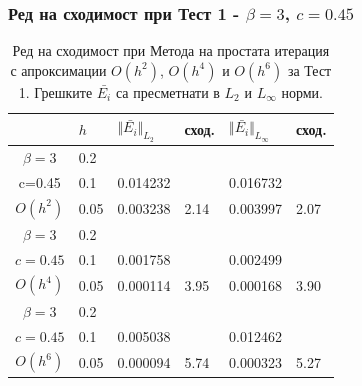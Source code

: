 \documentclass{beamer}
\begin{document}
\begin{frame}
\frametitle{Ред на сходимост при Тест 1 - $\beta = 3$, $c=0.45$}

\begin{table}[ht]
\centering
		\begin{tabular}{||c|l|ll|ll||}
			\hline
			\hline
             & $h$  &  	$\Vert \bar{ E_i} \Vert_{L_2}$ 	& сход.	& $\Vert \bar{ E_i} \Vert_{L_\infty}$  		&сход.   \\
   					\hline 
					\hline 
$\beta = 3$   	&0.2    										&            &            &           &   \\
      c=0.45 	&0.1    & 0.014232  						&            & 0.016732 			&   \\
   $O(h^2)$     &0.05   & 0.003238  						&2.14  & 0.003997					& 2.07 \\
\hline 
$\beta = 3$   	&0.2   &            &            &             &    \\
      $c=0.45 $ &0.1   &   0.001758   &           &  0.002499  &   \\
       $O(h^4)$	&0.05  &  0.000114 & 3.95    & 0.000168  & 3.90  \\
\hline
$\beta = 3$   	&0.2   &            &        &                  &      \\
   $c=0.45$   	&0.1   &  0.005038 &           & 0.012462       &       \\
     $O(h^6)$	&0.05  &  0.000094  & 5.74  &  0.000323 & 5.27         \\
			\hline
			\hline 
		\end{tabular}
		\caption{Ред на сходимост при Метода на простата итерация с апроксимации $O(h^{2})$, $O(h^{4})$ и $O(h^{6})$ за Тест  1. Грешките $\bar{ E_i}$ са пресметнати в $L_2$ и $L_\infty$ норми.}
\label{tab:aA}
\end{table}

\end{frame}
\end{document}
